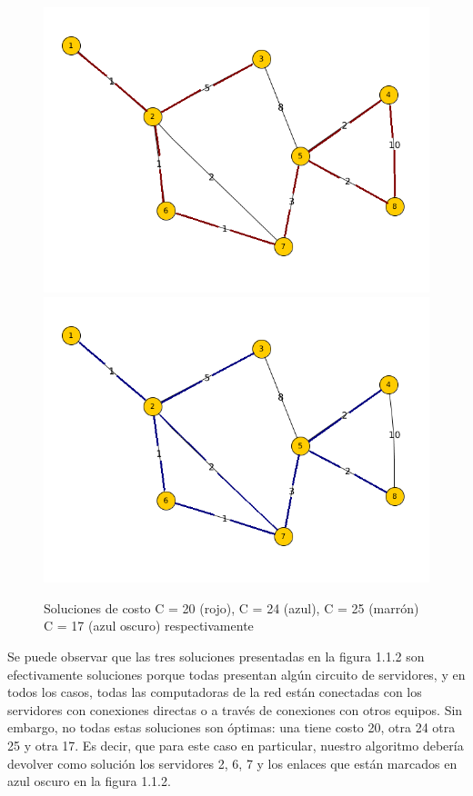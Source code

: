 \documentclass[11pt, a4paper, twoside]{article}
\begin{document}
\begin{figure}[H]
\includegraphics[scale=1]{imagenes/equipos5.png}
\includegraphics[scale=1]{imagenes/equipos7.png}
\caption{Soluciones de costo C = 20 (rojo), C = 24 (azul), C = 25 (marrón)
         C = 17 (azul oscuro) respectivamente}
\end{figure}

Se puede observar que las tres soluciones presentadas en la figura 1.1.2 
son efectivamente soluciones porque todas presentan algún circuito de
servidores, y en todos los casos, todas las computadoras de la red están 
conectadas con los servidores con conexiones directas o a través de conexiones
con otros equipos. Sin embargo, no todas estas soluciones son óptimas: una 
tiene costo 20, otra 24 otra 25 y otra 17. Es decir, que para este caso en particular,
nuestro algoritmo debería devolver como solución los servidores 2, 6, 7 y
los enlaces que están marcados en azul oscuro en la figura 1.1.2.
\end{document}
